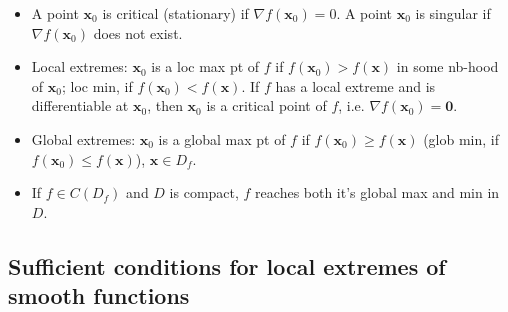\documentclass{article}
\newcommand{\Tr}[2]{#1}
\newcommand\bdx{\mathbf x}
\newcommand\bdzero{\mathbf 0}
\begin{document}
\begin{itemize}

\item %
  \Tr{A point }
     {Punkten}
$\bdx_0$
\Tr{is critical (stationary) if }
   {är kritisk (stationär) om}
$\nabla f(\bdx_0)=0$.
  \Tr{A point }
     {Punkten}
$\bdx_0$
\Tr{is singular if}
   {är singulär om}
$\nabla f(\bdx_0)$
\Tr{does not exist.}
   {ej existerar.}


\item \Tr{Local extremes:}{Lokala extrema:} %
  $\bdx_0$
  \Tr{is a loc max pt of}
     {är lok max till}
  $f$
  \Tr{if}
     {om}
  $f(\bdx_0)>f(\bdx)$
  \Tr{in some nb-hood of}
     {i ngn omgivning av}
  $\bdx_0$;
  \Tr{loc min, if}
     {lok min, om}
  $f(\bdx_0)<f(\bdx)$.
  \Tr{If}
     {Om}
  $f$
  \Tr{has a local extreme and is differentiable at}
     {har ett lok extremum och är diff-bar i}
  $\bdx_0$,
  \Tr{then}
     {då är}
  $\bdx_0$
  \Tr{is a critical point of}
     {en kritisk punkt av}
  $f$,
  \Tr{i.e.}
     {dvs}
  $\nabla f(\bdx_0)=\bdzero$.

  \item %
    \Tr{Global extremes}
       {Globala extrema}:
  $\bdx_0$
  \Tr{is a global max pt of}
     {är ett glob max till}
  $f$
  \Tr{if}
     {om}
  $f(\bdx_0)\ge f(\bdx)$
  (glob min,
  \Tr{if}
     {om}
  $f(\bdx_0)\le f(\bdx)$),
  $\bdx\in D_f$.%

\item %
  \Tr{If}
     {Om}
 $f\in  C(D_f)$
 \Tr{and}
    {och}
 $D$
 \Tr{is compact,}
    {är kompakt, når}
 $f$
 \Tr{reaches both it's global max and min in}
    {både sina globala max och min i}
 $D$.%

\end{itemize}%

\subsection*{\Tr{Sufficient conditions for local extremes of smooth functions}%
                {Tillräckliga villkor för lokala extrema}
}
\end{document}
